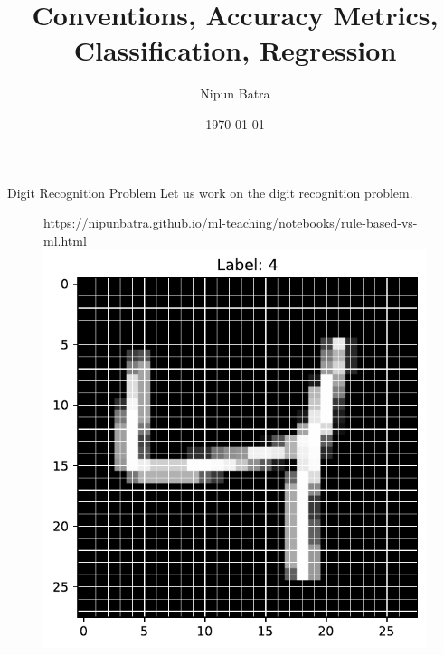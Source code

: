 \documentclass[usenames,dvipsnames]{beamer}
\title{Conventions, Accuracy Metrics, Classification, Regression}
\date{\today}
\author{Nipun Batra}
\institute{IIT Gandhinagar}
\begin{document}
%


  \maketitle
  
  \begin{frame}{Digit Recognition Problem}
  Let us work on the digit recognition problem.

		\begin{figure}[htp]
			\centering
			\begin{notebookbox}{https://nipunbatra.github.io/ml-teaching/notebooks/rule-based-vs-ml.html}
			  \includegraphics[scale=0.35]{../assets/accuracy-convention/figures/mnist.pdf}
			\end{notebookbox}
		  \end{figure}

	\end{frame}
\end{document}

